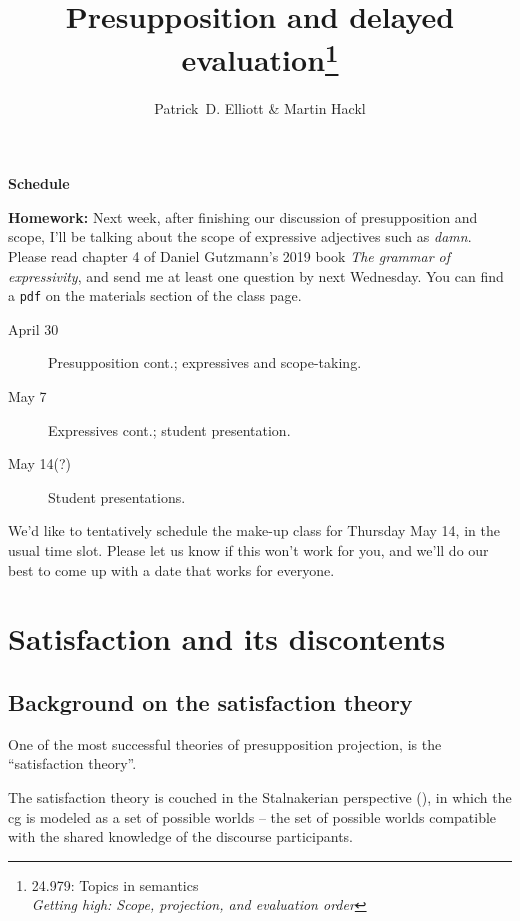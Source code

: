 \documentclass[nols,twoside,nofonts,nobib,nohyper]{tufte-handout}
\title{Presupposition and delayed evaluation\thanks{24.979: Topics in
    semantics\\\noindent\textit{Getting high: Scope, projection, and evaluation order}}}
\author[Patrick D. Elliott and Martin Hackl]{Patrick~D. Elliott \& Martin Hackl}
\begin{document}
\maketitle%

\begin{tcolorbox}
\textbf{Schedule}
\tcblower

\textbf{Homework:} Next week, after finishing our discussion of presupposition and scope, I'll be talking about the scope of expressive adjectives such as \textit{damn}. Please read chapter 4 of Daniel Gutzmann's 2019 book \textit{The grammar of expressivity}, and send me at least one question by next Wednesday. You can find a \texttt{pdf} on the materials section of the class page.

\begin{description}

    \item[April 30] Presupposition cont.; expressives and scope-taking.

    \item[May 7] Expressives cont.; student presentation.

    \item[May 14(?)] Student presentations.

\end{description}

We'd like to tentatively schedule the make-up class for Thursday May 14, in the usual time slot. Please let us know if this won't work for you, and we'll do our best to come up with a date that works for everyone.

\end{tcolorbox}

\section{Satisfaction and its discontents}

\subsection{Background on the satisfaction theory}

One of the most successful theories of presupposition projection, is the \enquote{satisfaction theory}.

The satisfaction theory is couched in the Stalnakerian perspective (\citeyear{stalnaker1976,stalnaker2002}), in which the \ac{cg} is modeled as a set of possible worlds -- the set of possible worlds compatible with the shared knowledge of the discourse participants.
\end{document}
